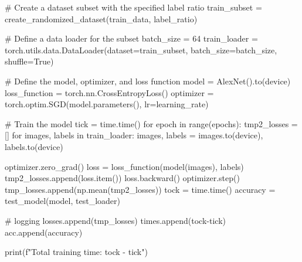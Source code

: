 \documentclass[10pt]{article}
\begin{document}
\begin{python}
        # Create a dataset subset with the specified label ratio
        train_subset = create_randomized_dataset(train_data, label_ratio)
    
        # Define a data loader for the subset
        batch_size = 64
        train_loader = torch.utils.data.DataLoader(dataset=train_subset, batch_size=batch_size, shuffle=True)
    
        # Define the model, optimizer, and loss function
        model = AlexNet().to(device)
        loss_function = torch.nn.CrossEntropyLoss()
        optimizer = torch.optim.SGD(model.parameters(), lr=learning_rate)
    
        # Train the model
        tick = time.time()
        for epoch in range(epochs):
            tmp2_losses = []
            for images, labels in train_loader:
                images, labels = images.to(device), labels.to(device)
    
                optimizer.zero_grad()
                loss = loss_function(model(images), labels)
                tmp2_losses.append(loss.item())
                loss.backward()
                optimizer.step()
            tmp_losses.append(np.mean(tmp2_losses))
        tock = time.time()
        accuracy = test_model(model, test_loader)
        
        # logging
        losses.append(tmp_losses)
        times.append(tock-tick)
        acc.append(accuracy)
        
        print(f"Total training time: {tock - tick}")
    
    \end{python}
\end{document}
